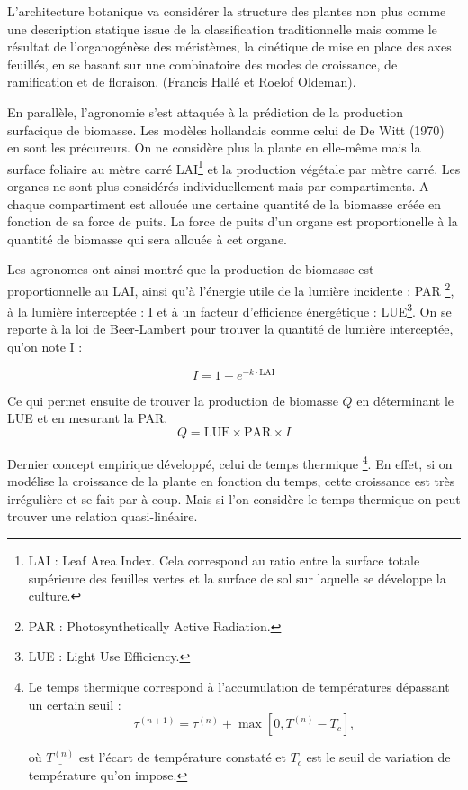 L’architecture botanique va considérer la structure des plantes non plus comme une description statique issue de la classification traditionnelle mais comme le résultat de l’organogénèse des méristèmes, la cinétique de mise en place des axes feuillés, en se basant sur une combinatoire des modes de croissance, de ramification et de floraison. (Francis Hallé et Roelof Oldeman).

En parallèle, l’agronomie s’est attaquée à la prédiction de la production surfacique de biomasse. Les modèles hollandais comme celui de De Witt (1970) en sont les précureurs. On ne considère plus la plante en elle-même mais la surface foliaire au mètre carré LAI\footnote{LAI : Leaf Area Index.
Cela correspond au ratio entre la surface totale supérieure des feuilles
vertes et la surface de sol sur laquelle se développe la culture.} 
et la production végétale par mètre carré.
Les organes ne sont plus considérés individuellement mais par compartiments. A chaque compartiment est allouée une certaine quantité de la biomasse créée en fonction de sa force de 
puits.
La force de puits d'un organe est proportionelle à la quantité de biomasse qui sera allouée à cet organe.\cite[~p.229--231]{hopkins2003physiologie}

Les agronomes ont ainsi montré que la production de biomasse est proportionnelle au LAI, ainsi qu'à l’énergie utile de la lumière incidente : PAR \footnote{PAR : Photosynthetically Active Radiation.}, à la lumière interceptée : I et à un facteur d’efficience énergétique : LUE\footnote{LUE : Light Use Efficiency.}. On se reporte à la loi de Beer-Lambert pour trouver la quantité de lumière interceptée, qu'on note I : 

\[ I = 1-e^{-k\cdot\mathrm{LAI}} \]

Ce qui permet ensuite de trouver la production de biomasse $Q$
en déterminant le LUE et en mesurant la PAR.
\[ 
  Q = \mathrm{LUE}\times\mathrm{PAR}\times I 
\]

Dernier concept empirique développé, celui de temps thermique
\footnote{Le temps thermique correspond à l'accumulation de températures dépassant un certain seuil :
\[
\tau^{(n+1)} = \tau^{(n)} + \max[0, \underline{T^{(n)}} - T_c], 
\]

où $\underline{T^{(n)}}$ est l'écart de température constaté et 
$T_c$ est le seuil de variation de température qu'on impose.
}.
En effet, si on modélise la croissance de la plante  en fonction du temps, cette croissance est très irrégulière et se fait par à coup. Mais si l’on considère le temps thermique on peut trouver une relation quasi-linéaire.

